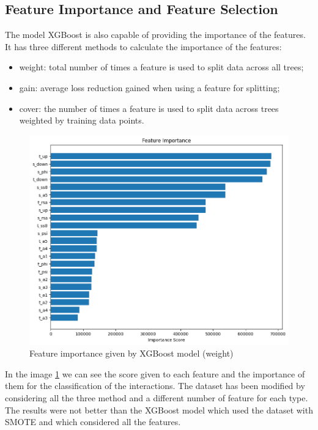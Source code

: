 \documentclass[10pt,twocolumn,letterpaper]{article}
\begin{document}
\subsection{Feature Importance and Feature Selection}
The model XGBoost is also capable of providing the importance of the features. It has three 
different methods to calculate the importance of the features: 
\begin{itemize}
    \item weight: total number of times a feature is used to split data across all trees;
    \item gain: average loss reduction gained when using a feature for splitting;
    \item cover: the number of times a feature is used to split data across trees weighted by training data points.
\end{itemize}
\begin{center}
    \begin{figure}[h!]
        \centering
        \includegraphics[scale=0.28]{img/fs.png}
        \caption{Feature importance given by XGBoost model (weight)}
        \label{fig:fs}
    \end{figure}
\end{center}
In the image \ref{fig:fs} we can see the score given to each feature and the importance of them 
for the classification of the interactions. The dataset has been modified by considering all the three method and a different number 
of feature for each type. The results were not better than the XGBoost model which used the dataset with SMOTE and which 
considered all the features.
\end{document}
